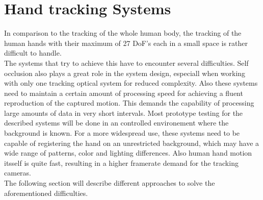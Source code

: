 \section{Hand tracking Systems}
\label{hand-tracking_systems}
In comparison to the tracking of the whole human body, the tracking of the human hands with their maximum of 27 DoF's each in a small space is rather difficult to handle.\\
The systems that try to achieve this have to encounter several difficulties. Self occlusion also plays a great role in the system design, especiall when working with only one tracking optical system for reduced complexity. Also these systems need to maintain a certain amount of processing speed for achieving a fluent reproduction of the captured motion. This demands the capability of processing large amounts of data in very short intervals. Most prototype testing for the described systems will be done in an controlled environement where the background is known. For a more widespread use, these systems need to be capable of registering the hand on an unrestricted background, which may have a wide range of patterns, color and lighting differences. Also human hand motion itsself is quite fast, resulting in a higher framerate demand for the tracking cameras.\\
The following section will describe different approaches to solve the aforementioned difficulties.

